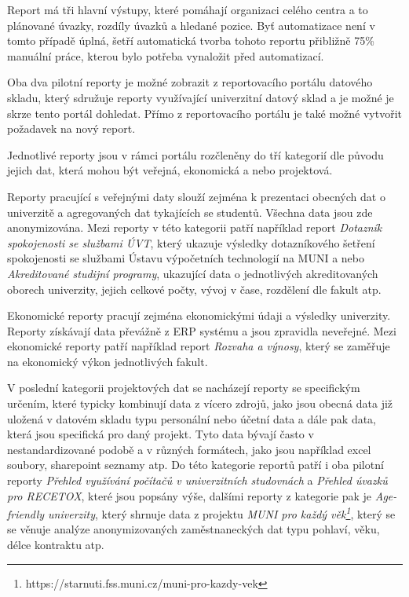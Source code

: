 \documentclass[
  digital,     %
  twoside,     %
  lof,         %
  lot,         %
]{fithesis4}
\begin{document}
Report má tři hlavní výstupy, které pomáhají organizaci celého centra a to plánované úvazky, rozdíly úvazků a hledané pozice. Byť automatizace není v tomto případě úplná, šetří automatická tvorba tohoto reportu přibližně 75\% manuální práce, kterou bylo potřeba vynaložit před automatizací.

Oba dva pilotní reporty je možné zobrazit z reportovacího portálu datového skladu, který sdružuje reporty využívající univerzitní datový sklad a je možné je skrze tento portál dohledat. Přímo z reportovacího portálu je také možné vytvořit požadavek na nový report.

Jednotlivé reporty jsou v rámci portálu rozčleněny do tří kategorií dle původu jejich dat, která mohou být veřejná, ekonomická a nebo projektová. 

Reporty pracující s veřejnými daty slouží zejména k prezentaci obecných dat o univerzitě a agregovaných dat tykajících se studentů. Všechna data jsou zde anonymizována. Mezi reporty v této kategorii patří například report \emph{Dotazník spokojenosti se službami ÚVT}, který ukazuje výsledky dotazníkového šetření spokojenosti se službami Ústavu výpočetních technologií na MUNI a nebo \emph{Akreditované studijní programy}, ukazující data o jednotlivých akreditovaných oborech univerzity, jejich celkové počty, vývoj v čase, rozdělení dle fakult atp.

Ekonomické reporty pracují zejména ekonomickými údaji a výsledky univerzity. Reporty získávají data převážně z ERP systému a jsou zpravidla neveřejné. Mezi ekonomické reporty patří například report \emph{Rozvaha a výnosy}, který se zaměřuje na ekonomický výkon jednotlivých fakult.

V poslední kategorii projektových dat se nacházejí reporty se specifickým určením, které typicky kombinují data z vícero zdrojů, jako jsou obecná data již uložená v datovém skladu typu personální nebo účetní data a dále pak data, která jsou specifická pro daný projekt. Tyto data bývají často v nestandardizované podobě a v různých formátech, jako jsou například excel soubory, sharepoint seznamy atp. Do této kategorie reportů patří i oba pilotní reporty \emph{Přehled využívání počítačů v univerzitních studovnách} a \emph{Přehled úvazků pro RECETOX}, které jsou popsány výše, dalšími reporty z kategorie pak je \emph{Age-friendly univerzity}, který shrnuje data z projektu \emph{MUNI pro každý věk\footnote{https://starnuti.fss.muni.cz/muni-pro-kazdy-vek}}, který se se věnuje analýze anonymizovaných zaměstnaneckých dat typu pohlaví, věku, délce kontraktu atp.
\end{document}
